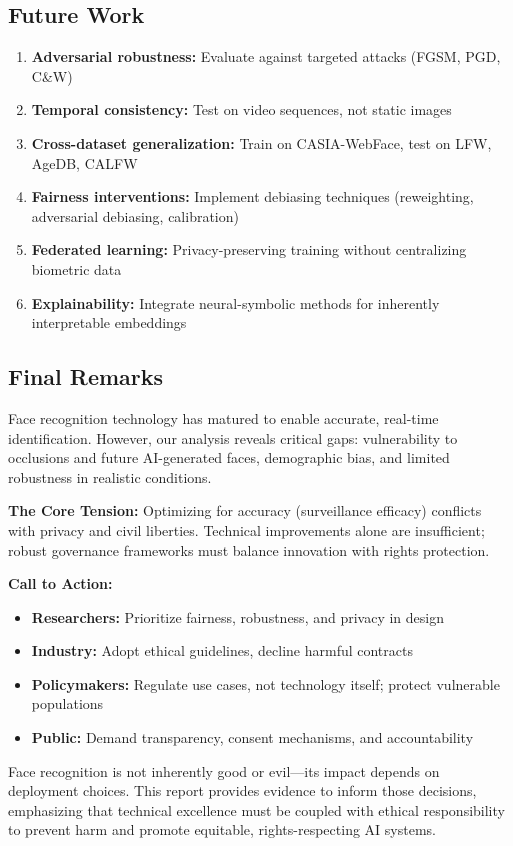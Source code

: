 \documentclass[11pt,a4paper]{article}
\begin{document}
\subsection{Future Work}

\begin{enumerate}
    \item \textbf{Adversarial robustness:} Evaluate against targeted attacks (FGSM, PGD, C\&W)
    \item \textbf{Temporal consistency:} Test on video sequences, not static images
    \item \textbf{Cross-dataset generalization:} Train on CASIA-WebFace, test on LFW, AgeDB, CALFW
    \item \textbf{Fairness interventions:} Implement debiasing techniques (reweighting, adversarial debiasing, calibration)
    \item \textbf{Federated learning:} Privacy-preserving training without centralizing biometric data
    \item \textbf{Explainability:} Integrate neural-symbolic methods for inherently interpretable embeddings
\end{enumerate}

\subsection{Final Remarks}

Face recognition technology has matured to enable accurate, real-time identification. However, our analysis reveals critical gaps: vulnerability to occlusions and future AI-generated faces, demographic bias, and limited robustness in realistic conditions.

\textbf{The Core Tension:} Optimizing for accuracy (surveillance efficacy) conflicts with privacy and civil liberties. Technical improvements alone are insufficient; robust governance frameworks must balance innovation with rights protection.

\textbf{Call to Action:}
\begin{itemize}
    \item \textbf{Researchers:} Prioritize fairness, robustness, and privacy in design
    \item \textbf{Industry:} Adopt ethical guidelines, decline harmful contracts
    \item \textbf{Policymakers:} Regulate use cases, not technology itself; protect vulnerable populations
    \item \textbf{Public:} Demand transparency, consent mechanisms, and accountability
\end{itemize}

Face recognition is not inherently good or evil—its impact depends on deployment choices. This report provides evidence to inform those decisions, emphasizing that technical excellence must be coupled with ethical responsibility to prevent harm and promote equitable, rights-respecting AI systems.



\end{document}
